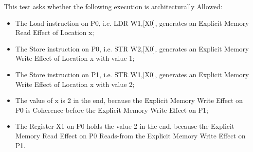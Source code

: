 This test asks whether the following execution is architecturally Allowed:

\begin{itemize}
  \item The Load instruction on P0, i.e. LDR W1,[X0], generates an Explicit Memory Read Effect of Location x;
  \item The Store instruction on P0, i.e. STR W2,[X0], generates an Explicit Memory Write Effect of Location x with value 1;
  \item The Store instruction on P1, i.e. STR W1,[X0], generates an Explicit Memory Write Effect of Location x with value 2;
  \item The value of x is 2 in the end, because the Explicit Memory Write Effect on P0 is Coherence-before the Explicit Memory Write Effect on P1;
  \item The Register X1 on P0 holds the value 2 in the end, because the Explicit Memory Read Effect on P0 Reads-from the Explicit Memory Write Effect on P1.
\end{itemize}
